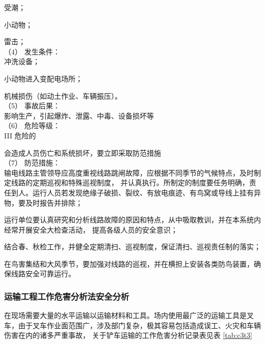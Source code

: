  受潮；

 小动物；

 雷击；\\

（4） 发生条件：\\

 冲洗设备；

 小动物进入变配电场所；

 机械损伤（如动土作业、车辆振压）。\\


（5） 事故后果：\\

影响生产，引起爆炸、泄露、中毒、设备损坏等\\

（6） 危险等级：\\

III 危险的

会造成人员伤亡和系统损坏，要立即采取防范措施\\

（7） 防范措施：\\

 输电线路主管领导应高度重视线路跳闸故障，应根据不同季节的气候特点，及时制定线路的定期巡视和特殊巡视制度，
并认真执行。所制定的制度要任务明确，责任到人。运行人员若发现绝缘子破损、裂纹、有放电痕迹、有鸟窝或导线上挂有异物，要及时报告并排除； 

 运行单位要认真研究和分析线路故障的原因和特点，从中吸取教训，并在本系统内经常开展安全大检查活动，
提高各级人员的安全意识；

 结合春、秋检工作，并健全定期清扫、巡视制度，保证清扫、巡视责任制的落实；

 在鸟害集结和大风季节，要加强对线路的巡视，并在横担上安装各类防鸟装置，确保线路安全可靠运行。

\subsubsection{运输工程工作危害分析法安全分析}

在现场需要大量的水平运输以运输材料和工具。场内使用最广泛的运输工具是叉车，由于叉车作业面范围广，涉及部门复杂，极其容易包括造成误工、火灾和车辆伤害在内的诸多严重事故，
关于铲车运输的工作危害分析记录表见表 \ref{tab:c3t3}


